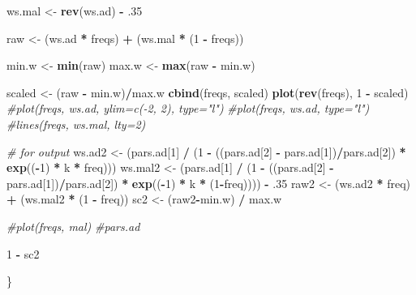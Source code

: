 \documentclass[]{article}
\newenvironment{Shaded}{\begin{snugshade}}{\end{snugshade}}
\newcommand{\KeywordTok}[1]{\textcolor[rgb]{0.13,0.29,0.53}{\textbf{#1}}}
\newcommand{\DecValTok}[1]{\textcolor[rgb]{0.00,0.00,0.81}{#1}}
\newcommand{\StringTok}[1]{\textcolor[rgb]{0.31,0.60,0.02}{#1}}
\newcommand{\CommentTok}[1]{\textcolor[rgb]{0.56,0.35,0.01}{\textit{#1}}}
\newcommand{\OperatorTok}[1]{\textcolor[rgb]{0.81,0.36,0.00}{\textbf{#1}}}
\newcommand{\NormalTok}[1]{#1}
\begin{document}
\begin{Shaded}
\begin{Highlighting}[]
\NormalTok{  ws.mal <-}\StringTok{ }\KeywordTok{rev}\NormalTok{(ws.ad) }\OperatorTok{-}\StringTok{ }\NormalTok{.}\DecValTok{35} 
  
\NormalTok{  raw <-}\StringTok{ }\NormalTok{(ws.ad }\OperatorTok{*}\StringTok{ }\NormalTok{freqs) }\OperatorTok{+}\StringTok{ }\NormalTok{(ws.mal }\OperatorTok{*}\StringTok{ }\NormalTok{(}\DecValTok{1} \OperatorTok{-}\StringTok{ }\NormalTok{freqs))}
  
\NormalTok{  min.w <-}\StringTok{ }\KeywordTok{min}\NormalTok{(raw)}
\NormalTok{  max.w <-}\StringTok{ }\KeywordTok{max}\NormalTok{(raw }\OperatorTok{-}\StringTok{ }\NormalTok{min.w)}
  
\NormalTok{  scaled <-}\StringTok{ }\NormalTok{(raw }\OperatorTok{-}\StringTok{ }\NormalTok{min.w)}\OperatorTok{/}\NormalTok{max.w}
  \KeywordTok{cbind}\NormalTok{(freqs, scaled)}
  \KeywordTok{plot}\NormalTok{(}\KeywordTok{rev}\NormalTok{(freqs), }\DecValTok{1} \OperatorTok{-}\StringTok{ }\NormalTok{scaled)}
  \CommentTok{#plot(freqs, ws.ad, ylim=c(-2, 2), type="l")}
  \CommentTok{#plot(freqs, ws.ad, type="l")}
  \CommentTok{#lines(freqs, ws.mal, lty=2)}
  
  \CommentTok{# for output}
\NormalTok{   ws.ad2 <-}\StringTok{ }\NormalTok{(pars.ad[}\DecValTok{1}\NormalTok{] }\OperatorTok{/}\StringTok{ }\NormalTok{(}\DecValTok{1} \OperatorTok{-}\StringTok{ }\NormalTok{((pars.ad[}\DecValTok{2}\NormalTok{] }\OperatorTok{-}\StringTok{ }\NormalTok{pars.ad[}\DecValTok{1}\NormalTok{])}\OperatorTok{/}\NormalTok{pars.ad[}\DecValTok{2}\NormalTok{]) }\OperatorTok{*}\StringTok{ }\KeywordTok{exp}\NormalTok{((}\OperatorTok{-}\DecValTok{1}\NormalTok{) }\OperatorTok{*}\StringTok{ }\NormalTok{k }\OperatorTok{*}\StringTok{ }\NormalTok{freq)))}
\NormalTok{   ws.mal2 <-}\StringTok{ }\NormalTok{(pars.ad[}\DecValTok{1}\NormalTok{] }\OperatorTok{/}\StringTok{ }\NormalTok{(}\DecValTok{1} \OperatorTok{-}\StringTok{ }\NormalTok{((pars.ad[}\DecValTok{2}\NormalTok{] }\OperatorTok{-}\StringTok{ }\NormalTok{pars.ad[}\DecValTok{1}\NormalTok{])}\OperatorTok{/}\NormalTok{pars.ad[}\DecValTok{2}\NormalTok{]) }\OperatorTok{*}\StringTok{ }\KeywordTok{exp}\NormalTok{((}\OperatorTok{-}\DecValTok{1}\NormalTok{) }\OperatorTok{*}\StringTok{ }\NormalTok{k }\OperatorTok{*}\StringTok{ }\NormalTok{(}\DecValTok{1}\OperatorTok{-}\NormalTok{freq)))) }\OperatorTok{-}\StringTok{ }\NormalTok{.}\DecValTok{35}
\NormalTok{   raw2 <-}\StringTok{ }\NormalTok{(ws.ad2 }\OperatorTok{*}\StringTok{ }\NormalTok{freq) }\OperatorTok{+}\StringTok{ }\NormalTok{(ws.mal2 }\OperatorTok{*}\StringTok{ }\NormalTok{(}\DecValTok{1} \OperatorTok{-}\StringTok{ }\NormalTok{freq))}
\NormalTok{   sc2 <-}\StringTok{ }\NormalTok{(raw2}\OperatorTok{-}\NormalTok{min.w) }\OperatorTok{/}\StringTok{ }\NormalTok{max.w}
  
  \CommentTok{#plot(freqs, mal)}
  \CommentTok{#pars.ad}

  \DecValTok{1} \OperatorTok{-}\StringTok{ }\NormalTok{sc2}

\NormalTok{\}}
\end{Highlighting}
\end{Shaded}
\end{document}
